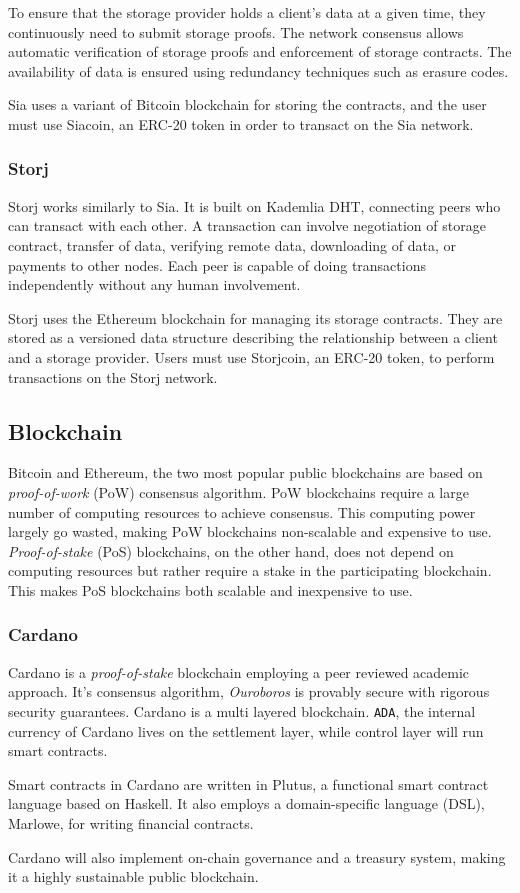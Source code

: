 To ensure that the storage provider holds a client's data at a given time, they continuously need to submit storage proofs. The network consensus allows automatic verification of storage proofs and enforcement of storage contracts. The availability of data is ensured using redundancy techniques such as erasure codes.

Sia uses a variant of Bitcoin blockchain for storing the contracts, and the user must use Siacoin, an ERC-20 token in order to transact on the Sia network.

\subsubsection{Storj}
Storj\cite{wilkinson2014storj} works similarly to Sia. It is built on Kademlia\cite{maymounkov2002kademlia} DHT, connecting peers who can transact with each other. A transaction can involve negotiation of storage contract, transfer of data, verifying remote data, downloading of data, or payments to other nodes. Each peer is capable of doing transactions independently without any human involvement.

Storj uses the Ethereum blockchain for managing its storage contracts. They are stored as a versioned data structure describing the relationship between a client and a storage provider. Users must use Storjcoin, an ERC-20 token, to perform transactions on the Storj network.

\subsection{Blockchain}
Bitcoin\cite{nakamoto2008bitcoin} and Ethereum\cite{buterin2014ethereum}, the two most popular public blockchains are based on \textit{proof-of-work} (PoW)\cite{wiki:pow} consensus algorithm. PoW blockchains require a large number of computing resources to achieve consensus. This computing power largely go wasted, making PoW blockchains non-scalable and expensive to use. \textit{Proof-of-stake} (PoS)\cite{wiki:pos} blockchains, on the other hand, does not depend on computing resources but rather require a stake in the participating blockchain. This makes PoS blockchains both scalable and inexpensive to use.

\subsubsection{Cardano}
Cardano\cite{web:cardano:1} is a \textit{proof-of-stake} blockchain employing a peer reviewed academic approach. It's consensus algorithm, \textit{Ouroboros}\cite{kiayias2017ouroboros} is provably secure with rigorous security guarantees. Cardano is a multi layered blockchain. \texttt{ADA}, the internal currency of Cardano lives on the settlement layer, while control layer will run smart contracts.

Smart contracts in Cardano are written in Plutus\cite{web:plutus:1}, a functional smart contract language based on Haskell. It also employs a domain-specific language (DSL), Marlowe\cite{seijas2018marlowe}, for writing financial contracts.

Cardano will also implement on-chain governance and a {treasury system}\cite{zhang2019treasury}, making it a highly sustainable public blockchain.